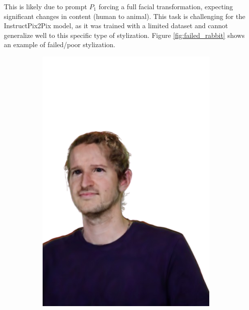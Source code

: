This is likely due to prompt $P_1$ forcing a full facial transformation, expecting significant changes in content (human to animal). This task is challenging for the InstructPix2Pix model, as it was trained with a limited dataset and cannot generalize well to this specific type of stylization. Figure \ref{fig:failed_rabbit} shows an example of failed/poor stylization.

\begin{figure}[ht]
	\centering
	\begin{subfigure}{0.2\linewidth}
		\includegraphics[width=\textwidth]{Figures/failed/rabbit/3_render-removebg-preview.png}
	\end{subfigure}
	\begin{subfigure}{0.2\linewidth}

\end{subfigure}
\end{figure}

